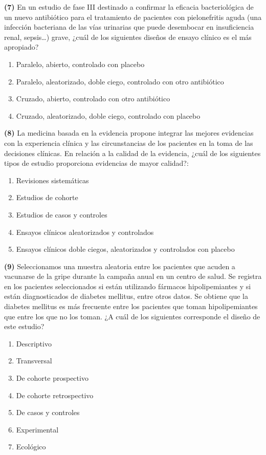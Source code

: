 \documentclass[
]{book}
\providecommand{\tightlist}{%
  \setlength{\itemsep}{0pt}\setlength{\parskip}{0pt}}
\theoremstyle{definition}
\theoremstyle{definition}
\theoremstyle{definition}
\theoremstyle{definition}
\theoremstyle{remark}
\begin{document}
\textbf{(7)} En un estudio de fase III destinado a confirmar la eficacia bacteriológica de un nuevo antibiótico para el tratamiento de pacientes con pielonefritis aguda (una infección bacteriana de las vías urinarias que puede desembocar en insuficiencia renal, sepsis\ldots) grave, ¿cuál de los siguientes diseños de ensayo clínico es el más apropiado?

\begin{enumerate}
\def\labelenumi{\arabic{enumi}.}
\tightlist
\item
  Paralelo, abierto, controlado con placebo
\item
  Paralelo, aleatorizado, doble ciego, controlado con otro antibiótico
\item
  Cruzado, abierto, controlado con otro antibiótico
\item
  Cruzado, aleatorizado, doble ciego, controlado con placebo
\end{enumerate}

\textbf{(8)} La medicina basada en la evidencia propone integrar las mejores evidencias con la experiencia clínica y las circunstancias de los pacientes en la toma de las decisiones clínicas. En relación a la calidad de la evidencia, ¿cuál de los siguientes tipos de estudio proporciona evidencias de mayor calidad?:

\begin{enumerate}
\def\labelenumi{\arabic{enumi}.}
\tightlist
\item
  Revisiones sistemáticas
\item
  Estudios de cohorte
\item
  Estudios de casos y controles
\item
  Ensayos clínicos aleatorizados y controlados
\item
  Ensayos clínicos doble ciegos, aleatorizados y controlados con placebo
\end{enumerate}

\textbf{(9)} Seleccionamos una muestra aleatoria entre los pacientes que acuden a vacunarse de la gripe durante la campaña anual en un centro de salud. Se registra en los pacientes seleccionados si están utilizando fármacos hipolipemiantes y si están diagnosticados de diabetes mellitus, entre otros datos. Se obtiene que la diabetes mellitus es más frecuente entre los pacientes que toman hipolipemiantes que entre los que no los toman. ¿A cuál de los siguientes corresponde el diseño de este estudio?

\begin{enumerate}
\def\labelenumi{\arabic{enumi}.}
\tightlist
\item
  Descriptivo
\item
  Transversal
\item
  De cohorte prospectivo
\item
  De cohorte retrospectivo
\item
  De casos y controles
\item
  Experimental
\item
  Ecológico
\end{enumerate}
\end{document}
